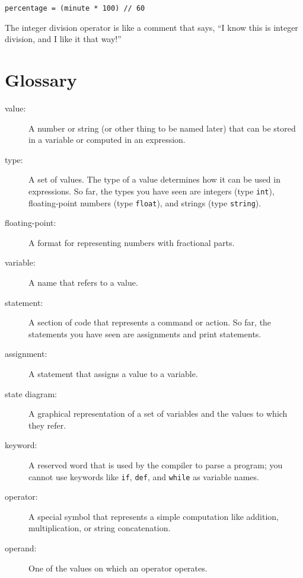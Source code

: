 \beforeverb
\begin{verbatim}
percentage = (minute * 100) // 60 
\end{verbatim}
\afterverb
%
The integer division operator is like a comment that says, ``I know
this is integer division, and I like it that way!''

\section{Glossary}

\begin{description}

\item[value:]  A number or string (or other thing to be named later)
that can be stored in a variable or computed in an expression.

\item[type:]  A set of values.  The type of a value determines how
it can be used in expressions.  So far, the types you have seen are integers
(type {\tt int}), floating-point numbers (type {\tt float}),
and strings (type {\tt string}).

\item[floating-point:] A format for representing numbers with fractional
parts.

\item[variable:]  A name that refers to a value.

\item[statement:]  A section of code that represents a command or action.  So
far, the statements you have seen are assignments and print statements.

\item[assignment:]  A statement that assigns a value to a variable.

\item[state diagram:]  A graphical representation of a set of variables and the
values to which they refer.

\item[keyword:]  A reserved word that is used by the compiler to parse a
program; you cannot use keywords like {\tt if}, {\tt  def}, and {\tt while} as
variable names.

\item[operator:]  A special symbol that represents a simple computation like
addition, multiplication, or string concatenation.

\item[operand:]  One of the values on which an operator operates.


\end{description}
